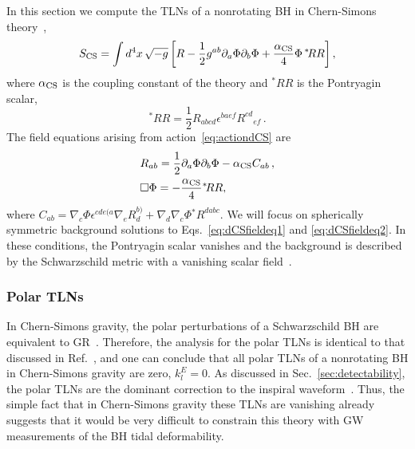 \documentclass[aps,twocolumn,showpacs,preprintnumbers,nofootinbib,prd,superscriptaddress,groupedaddress,10pt]{revtex4-1}
\begin{document}
In this section we compute the TLNs of a nonrotating BH in Chern-Simons theory~\cite{Alexander:2009tp},
%
\begin{equation}\label{eq:actiondCS}
S_{\text{CS}}=\int d^4x\,\sqrt{-g}\left[R -\frac{1}{2}g^{ab}\partial_a\Phi\partial_b\Phi+\frac{\alpha_{\rm CS}}{4} \Phi \,{}^*\!RR \right],
\end{equation}
%
where $\alpha_{\rm CS}$ is the coupling constant of the theory and ${}^*RR$ is the Pontryagin scalar,
%
\begin{equation}
{}^*\!RR=\frac{1}{2}R_{abcd}\epsilon^{baef}{R^{cd}}_{ef}\,.
\end{equation}
%
The field equations arising from action~\eqref{eq:actiondCS} are
%
\begin{align}
\label{eq:dCSfieldeq1}
&R_{ab}= \frac{1}{2}\partial_a\Phi\partial_b\Phi-\alpha_{\rm CS} C_{ab} \,, \\
\label{eq:dCSfieldeq2}
&\square\Phi=-\frac{\alpha_{\rm CS}}{4}{}^*\!RR,
\end{align}
%
where $C_{ab}=\nabla_c\Phi\epsilon^{cde(a}\nabla_eR^{b)}_d+\nabla_{d}\nabla_{c}\Phi{}^*\!R^{dabc}$.
%
We will focus on spherically symmetric background solutions to Eqs.~\eqref{eq:dCSfieldeq1} and \eqref{eq:dCSfieldeq2}. In these conditions, the Pontryagin scalar vanishes and the background is described by the Schwarzschild metric with a vanishing scalar field~\cite{Jackiw:2003pm,Yunes:2007ss,Molina:2010fb}. 


\subsubsection{Polar TLNs}

In Chern-Simons gravity, the polar perturbations of a Schwarzschild BH are equivalent to GR~\cite{Cardoso:2009pk,Molina:2010fb}. Therefore, the analysis for the polar TLNs is identical to that discussed in Ref.~\cite{Binnington:2009bb}, and one can conclude that all polar TLNs of a nonrotating BH in Chern-Simons gravity are zero, $k^E_{l}=0$.
%
As discussed in Sec.~\ref{sec:detectability}, the polar TLNs are the dominant correction to the inspiral waveform~\cite{Vines:2011ud}. Thus, the simple fact that in Chern-Simons gravity these TLNs are vanishing already suggests that it would be very difficult to constrain this theory with GW measurements of the BH tidal deformability.


\end{document}
